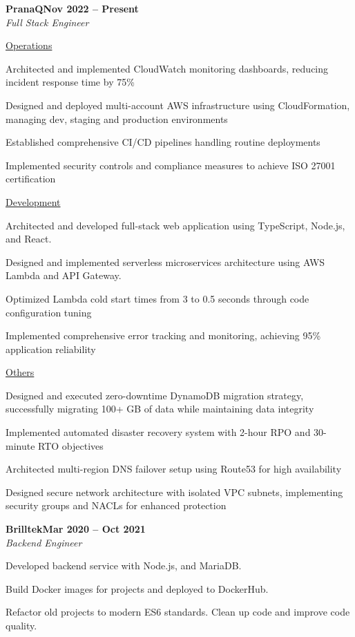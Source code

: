 \documentclass[letterpaper,10pt]{article}
\newcommand{\heading}[2]{
  \hspace{10pt}#1\hfill#2\\
}
\newcommand{\headingBf}[2]{
  \heading{\textbf{#1}}{\textbf{#2}}
}
\newcommand{\headingIt}[2]{
  \heading{\textit{#1}}{\textit{#2}}
}
\newenvironment{resume_list}{
  \vspace{-7pt}
  \begin{itemize}[itemsep=-2px, parsep=1pt, leftmargin=30pt]
}{
  \end{itemize}
}
\newcommand{\itemTitle}[1]{
  \item[] \underline{#1}\vspace{4pt}
}
\begin{document}
  \headingBf{PranaQ}{Nov 2022 -- Present}
  \headingIt{Full Stack Engineer}{}
  \begin{resume_list}
	\vspace{6pt}
	\itemTitle{Operations}
	\item Architected and implemented CloudWatch monitoring dashboards, reducing incident response time by 75\%
	\item Designed and deployed multi-account AWS infrastructure using CloudFormation, managing dev, staging and production environments
	\item Established comprehensive CI/CD pipelines handling routine deployments
	\item Implemented security controls and compliance measures to achieve ISO 27001 certification
	\vspace{6pt}
	\itemTitle{Development}
	\item Architected and developed full-stack web application using TypeScript, Node.js, and React.
	\item Designed and implemented serverless microservices architecture using AWS Lambda and API Gateway.%
	\item Optimized Lambda cold start times from 3 to 0.5 seconds through code configuration tuning
	\item Implemented comprehensive error tracking and monitoring, achieving 95\% application reliability
	\vspace{6pt}
	\itemTitle{Others}
	\item Designed and executed zero-downtime DynamoDB migration strategy, successfully migrating 100+ GB of data while maintaining data integrity
	\item Implemented automated disaster recovery system with 2-hour RPO and 30-minute RTO objectives
	\item Architected multi-region DNS failover setup using Route53 for high availability
	\item Designed secure network architecture with isolated VPC subnets, implementing security groups and NACLs for enhanced protection
  \end{resume_list}

  \headingBf{Brilltek}{Mar 2020 -- Oct 2021}
  \headingIt{Backend Engineer}{}
  \begin{resume_list}
	\item Developed backend service with Node.js, and MariaDB.
	\item Build Docker images for projects and deployed to DockerHub.
	\item Refactor old projects to modern ES6 standards. Clean up code and improve code quality.
  \end{resume_list}
\end{document}
